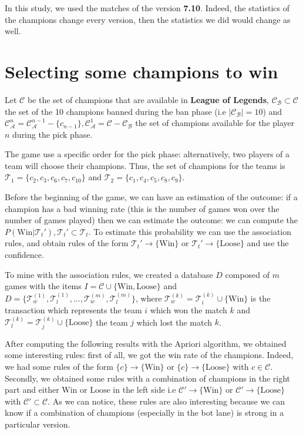 \documentclass{article}
\def\lol{\textbf{League of Legends}}
\def\version{\textbf{7.10}}
\def\champion{\mathcal{C}}
\def\ban{\champion_\mathcal{B}}
\def\available#1{\champion_\mathcal{A}^{#1}}
\def\team#1{\mathcal{T}_{#1}}
\def\win{\text{Win}}
\def\loose{\text{Loose}}
\def\rules#1#2{#1 \rightarrow #2}
\def\items{I}
\def\database{D}
\begin{document}
In this study, we used the matches of the version \version. Indeed, the statistics of the champions change every version, then the statistics we did would change as well.

\section{Selecting some champions to win}

Let $\champion$ be the set of champions that are available in \lol, $\ban \subset \champion$ the set of the 10 champions banned during the ban phase (i.e $|\ban|=10$) and $\available{n} = \available{n-1}-\{c_{n-1}\}, \available{1} = \champion-\ban$ the set of champions available for the player $n$ during the pick phase.

The game use a specific order for the pick phase: alternatively, two players of a team will choose their champions. Thus, the set of champions for the teams is $\team{1} = \{c_2, c_3, c_6, c_7, c_{10}\}$ and $\team{2} = \{c_1, c_4, c_5, c_8, c_9\}$.

Before the beginning of the game, we can have an estimation of the outcome: if a champion has a bad winning rate (this is the number of games won over the number of games played) then we can estimate the outcome: we can compute the $P(\win|\team{t}'), \team{t}'\subset \team{t}$. To estimate this probability we can use the association rules, and obtain rules of the form $\rules{\team{t}'}{\{\win\}}$ or $\rules{\team{t}'}{\{\loose\}}$ and use the confidence.

To mine with the association rules, we created a database $\database$ composed of $m$ games with the items $\items=\champion\cup\{\win,\loose\}$ and $\database = \{\team{w}^{(1)}, \team{l}^{(1)},\dots, \team{w}^{(m)}, \team{l}^{(m)}\}$, where $\team{w}^{(k)}=\team{i}^{(k)}\cup\{\win\}$ is the transaction which represents the team $i$ which won the match $k$ and $\team{l}^{(k)}=\team{j}^{(k)}\cup\{\loose\}$ the team $j$ which lost the match $k$. 

After computing the following results with the Apriori algorithm, we obtained some interesting rules: first of all, we got the win rate of the champions. Indeed, we had some rules of the form $\rules{\{c\}}{\{\win\}}$ or $\rules{\{c\}}{\{\loose\}}$ with $c\in\champion$. Secondly, we obtained some rules with a combination of champions in the right part and either $\win$ or $\loose$ in the left side i.e $\rules{\champion'}{\{\win\}}$ or $\rules{\champion'}{\{\loose\}}$ with $\champion'\subset\champion$. As we can notice, these rules are also interesting because we can know if a combination of champions (especially in the bot lane) is strong in a particular version.
\end{document}
